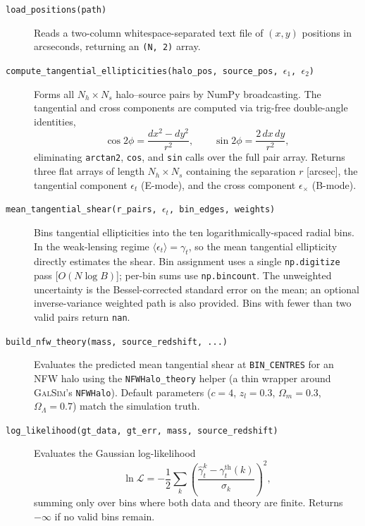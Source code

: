 \begin{description}
  \item[\texttt{load\_positions(path)}]
    Reads a two-column whitespace-separated text file of $(x, y)$ positions
    in arcseconds, returning an \texttt{(N, 2)} array.

  \item[\texttt{compute\_tangential\_ellipticities(halo\_pos, source\_pos,
        $\epsilon_1$, $\epsilon_2$)}]
    Forms all $N_h \times N_s$ halo--source pairs by NumPy broadcasting.
    The tangential and cross components are computed via trig-free double-angle
    identities,
    \begin{equation}
        \cos 2\phi = \frac{dx^2 - dy^2}{r^2}, \qquad
        \sin 2\phi = \frac{2\,dx\,dy}{r^2},
    \end{equation}
    eliminating \texttt{arctan2}, \texttt{cos}, and \texttt{sin} calls over the
    full pair array. Returns three flat arrays of length $N_h \times N_s$
    containing the separation $r$ [arcsec], the tangential component
    $\epsilon_t$ (E-mode), and the cross component $\epsilon_\times$ (B-mode).

  \item[\texttt{mean\_tangential\_shear(r\_pairs, $\epsilon_t$, bin\_edges, weights)}]
    Bins tangential ellipticities into the ten logarithmically-spaced radial
    bins. In the weak-lensing regime $\langle\epsilon_t\rangle = \gamma_t$, so
    the mean tangential ellipticity directly estimates the shear.
    Bin assignment uses a single \texttt{np.digitize} pass [$O(N\log B)$]; per-bin
    sums use \texttt{np.bincount}. The unweighted uncertainty is the
    Bessel-corrected standard error on the mean; an optional
    inverse-variance weighted path is also provided. Bins with fewer than two
    valid pairs return \texttt{nan}.

  \item[\texttt{build\_nfw\_theory(mass, source\_redshift, ...)}]
    Evaluates the predicted mean tangential shear at \texttt{BIN\_CENTRES} for
    an NFW halo using the \texttt{NFWHalo\_theory} helper (a thin wrapper
    around \textsc{GalSim}'s \texttt{NFWHalo}). Default parameters
    ($c = 4$, $z_l = 0.3$, $\Omega_m = 0.3$, $\Omega_\Lambda = 0.7$) match
    the simulation truth.

  \item[\texttt{log\_likelihood(gt\_data, gt\_err, mass, source\_redshift)}]
    Evaluates the Gaussian log-likelihood
    \begin{equation}
        \ln\mathcal{L} = -\frac{1}{2}
        \sum_k \left(\frac{\hat\gamma_t^k - \gamma_t^{\mathrm{th}}(k)}
                          {\sigma_k}\right)^2,
    \end{equation}
    summing only over bins where both data and theory are finite. Returns
    $-\infty$ if no valid bins remain.


\end{description}
